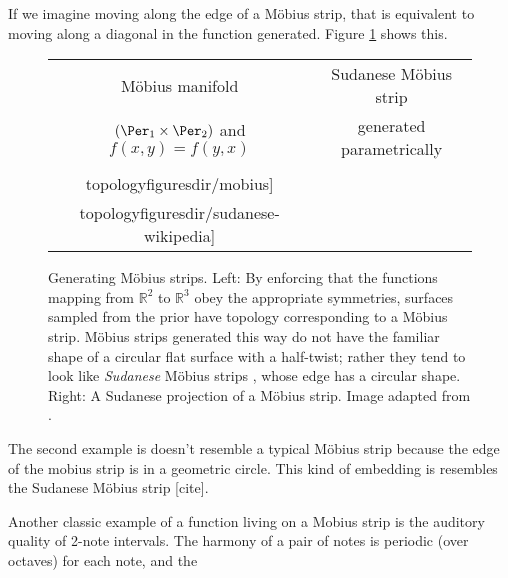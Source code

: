 If we imagine moving along the edge of a M\"{o}bius strip, that is equivalent to moving along a diagonal in the function generated.
Figure \ref{fig:mobius} shows this.
%
\begin{figure}
\begin{tabular}[t]{c|c}
\centering
M\"{o}bius manifold & 
Sudanese M\"{o}bius strip \\
$( \Per_1 \times \Per_2 )$ and $f(x,y) = f(y,x)$ & generated parametrically\\
\texttt{[image: \\topologyfiguresdir/mobius]} &
\raisebox{1cm}{\texttt{[image: \\topologyfiguresdir/sudanese-wikipedia]}}
\end{tabular}
\caption[Generating M\"{o}bius strips]{Generating M\"{o}bius strips.
Left: By enforcing that the functions mapping from $\mathbb{R}^2$ to $\mathbb{R}^3$ obey the appropriate symmetries, surfaces sampled from the prior have topology corresponding to a M\"{o}bius strip.
M\"{o}bius strips generated this way do not have the familiar shape of a circular flat surface with a half-twist; rather they tend to look like \emph{Sudanese} M\"{o}bius strips \citep{sudanese1984}, whose edge has a circular shape.
Right: A Sudanese projection of a M\"{o}bius strip.
Image adapted from \citep{sudanesepict}.
}
\label{fig:mobius}
\end{figure}
%
The second example is doesn't resemble a typical M\"{o}bius strip because the edge of the mobius strip is in a geometric circle.  This kind of embedding is resembles the Sudanese M\"{o}bius strip [cite].

Another classic example of a function living on a Mobius strip is the auditory quality of 2-note intervals.  The harmony of a pair of notes is periodic (over octaves) for each note, and the 


